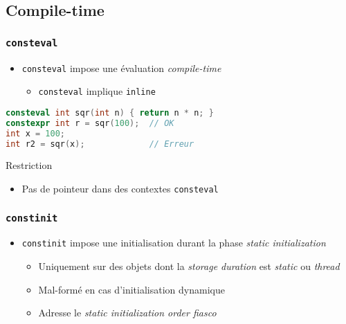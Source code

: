 \documentclass[C++.tex]{subfiles}
\begin{document}
\subsection*{Compile-time}
\begin{frame}[fragile]
	\frametitle{\lstinline|consteval|}
	\begin{itemize}
		\item \lstinline|consteval| impose une évaluation \textit{compile-time}


		\begin{itemize}
			\item \lstinline|consteval| implique \lstinline|inline|
		\end{itemize}
	\end{itemize}

	\begin{lstlisting}[language=C++]
consteval int sqr(int n) { return n * n; }
constexpr int r = sqr(100);  // OK
int x = 100;
int r2 = sqr(x);             // Erreur\end{lstlisting}

	\begin{alertblock}{Restriction}
		\begin{itemize}
			\item Pas de pointeur dans des contextes \lstinline|consteval|
		\end{itemize}
	\end{alertblock}
\end{frame}

\begin{frame}[fragile]
	\frametitle{\lstinline|constinit|}
	\begin{itemize}
		\item \lstinline|constinit| impose une initialisation durant la phase \textit{static initialization}
		\begin{itemize}
			\item Uniquement sur des objets dont la \textit{storage duration} est \textit{static} ou \textit{thread}
			\item Mal-formé en cas d'initialisation dynamique
			\item Adresse le \textit{static initialization order fiasco}
		\end{itemize}
	\end{itemize}
\end{frame}
\end{document}
